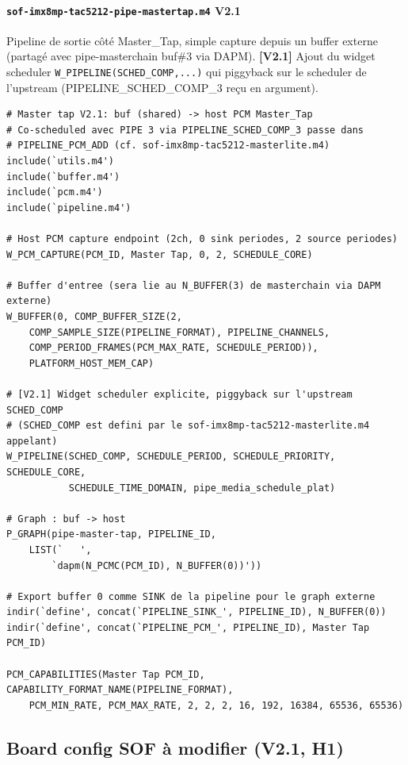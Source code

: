 \documentclass[11pt,a4paper]{article}
\begin{document}
\paragraph{\texttt{sof-imx8mp-tac5212-pipe-mastertap.m4} V2.1}
Pipeline de sortie côté Master\_Tap, simple capture depuis un buffer externe (partagé avec pipe-masterchain buf\#3 via DAPM). \textbf{[V2.1]} Ajout du widget scheduler \texttt{W\_PIPELINE(SCHED\_COMP,...)} qui piggyback sur le scheduler de l'upstream (PIPELINE\_SCHED\_COMP\_3 reçu en argument).
\begin{lstlisting}[language={}, basicstyle=\ttfamily\scriptsize]
# Master tap V2.1: buf (shared) -> host PCM Master_Tap
# Co-scheduled avec PIPE 3 via PIPELINE_SCHED_COMP_3 passe dans
# PIPELINE_PCM_ADD (cf. sof-imx8mp-tac5212-masterlite.m4)
include(`utils.m4')
include(`buffer.m4')
include(`pcm.m4')
include(`pipeline.m4')

# Host PCM capture endpoint (2ch, 0 sink periodes, 2 source periodes)
W_PCM_CAPTURE(PCM_ID, Master Tap, 0, 2, SCHEDULE_CORE)

# Buffer d'entree (sera lie au N_BUFFER(3) de masterchain via DAPM externe)
W_BUFFER(0, COMP_BUFFER_SIZE(2,
    COMP_SAMPLE_SIZE(PIPELINE_FORMAT), PIPELINE_CHANNELS,
    COMP_PERIOD_FRAMES(PCM_MAX_RATE, SCHEDULE_PERIOD)),
    PLATFORM_HOST_MEM_CAP)

# [V2.1] Widget scheduler explicite, piggyback sur l'upstream SCHED_COMP
# (SCHED_COMP est defini par le sof-imx8mp-tac5212-masterlite.m4 appelant)
W_PIPELINE(SCHED_COMP, SCHEDULE_PERIOD, SCHEDULE_PRIORITY, SCHEDULE_CORE,
           SCHEDULE_TIME_DOMAIN, pipe_media_schedule_plat)

# Graph : buf -> host
P_GRAPH(pipe-master-tap, PIPELINE_ID,
    LIST(`   ',
        `dapm(N_PCMC(PCM_ID), N_BUFFER(0))'))

# Export buffer 0 comme SINK de la pipeline pour le graph externe
indir(`define', concat(`PIPELINE_SINK_', PIPELINE_ID), N_BUFFER(0))
indir(`define', concat(`PIPELINE_PCM_', PIPELINE_ID), Master Tap PCM_ID)

PCM_CAPABILITIES(Master Tap PCM_ID, CAPABILITY_FORMAT_NAME(PIPELINE_FORMAT),
    PCM_MIN_RATE, PCM_MAX_RATE, 2, 2, 2, 16, 192, 16384, 65536, 65536)
\end{lstlisting}

\subsection{Board config SOF à modifier (V2.1, H1)}
\end{document}
